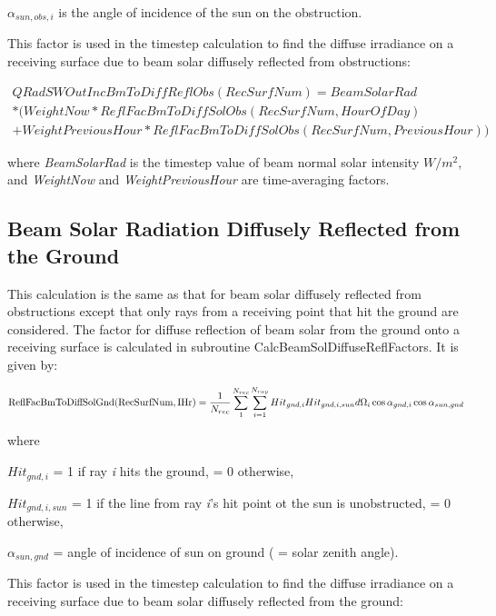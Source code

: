\({\alpha_{sun,obs,i}}\) is the angle of incidence of the sun on the obstruction.

This factor is used in the timestep calculation to find the diffuse irradiance on a receiving surface due to beam solar diffusely reflected from obstructions:

\begin{equation}
\begin{split}
QRadSWOutIncBmToDiffReflObs(RecSurfNum) = BeamSolarRad \\
* (WeightNow * ReflFacBmToDiffSolObs(RecSurfNum,HourOfDay) \\
+ WeightPreviousHour * ReflFacBmToDiffSolObs(RecSurfNum,PreviousHour))
\end{split}
\end{equation}

where \emph{BeamSolarRad} is the timestep value of beam normal solar intensity \(W/{m^2}\), and \emph{WeightNow} and \emph{WeightPreviousHour} are time-averaging factors.

\subsection{Beam Solar Radiation Diffusely Reflected from the Ground}\label{beam-solar-radiation-diffusely-reflected-from-the-ground}

This calculation is the same as that for beam solar diffusely reflected from obstructions except that only rays from a receiving point that hit the ground are considered. The factor for diffuse reflection of beam solar from the ground onto a receiving surface is calculated in subroutine CalcBeamSolDiffuseReflFactors. It is given by:

{\scriptsize
\begin{equation}
{\rm{ReflFacBmToDiffSolGnd(RecSurfNum,IHr)}} = \frac{1}{{{N_{rec}}}}\sum\limits_1^{{N_{rec}}} {\sum\limits_{i = 1}^{{N_{ray}}} {Hi{t_{gnd,i}}Hi{t_{gnd,i,sun}}d{\Omega_i}\cos {\alpha_{gnd,i}}\cos {\alpha_{sun,gnd}}} }
\end{equation}}

where

\(Hi{t_{gnd,i}}\) = 1 if ray \emph{i} hits the ground, = 0 otherwise,

\(Hi{t_{gnd,i,sun}}\) = 1 if the line from ray \emph{i}'s hit point ot the sun is unobstructed, = 0 otherwise,

\({\alpha_{sun,gnd}}\) = angle of incidence of sun on ground ( = solar zenith angle).

This factor is used in the timestep calculation to find the diffuse irradiance on a receiving surface due to beam solar diffusely reflected from the ground:

